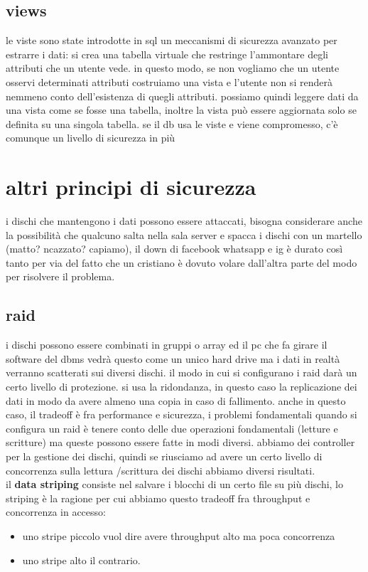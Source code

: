 \documentclass[12pt, oneside]{extbook} %
\begin{document}
\subsection{views}
le viste sono state introdotte in sql un meccanismi di sicurezza avanzato per estrarre i dati: si crea una tabella virtuale che restringe l'ammontare degli attributi che un utente vede. in questo modo, se non vogliamo che un utente osservi determinati attributi costruiamo una vista e l'utente non si renderà nemmeno conto dell'esistenza di quegli attributi. possiamo quindi leggere dati da una vista come se fosse una tabella, inoltre la vista può essere aggiornata solo se definita su una singola tabella. se il db usa le viste e viene compromesso, c'è comunque un livello di sicurezza in più

\section{altri principi di sicurezza}
i dischi che mantengono i dati possono essere attaccati, bisogna considerare anche la possibilità che qualcuno salta nella sala server e spacca i dischi con un martello (matto? ncazzato? capiamo), il down di facebook whatsapp e ig è durato così tanto per via del fatto che un cristiano è dovuto volare dall'altra parte del modo per risolvere il problema.
\subsection{raid}
i dischi possono essere combinati in gruppi o array ed il pc che fa girare il software del dbms vedrà questo come un unico hard drive ma i dati in realtà verranno scatterati sui diversi dischi. il modo in cui si configurano i raid darà un certo livello di protezione. si usa la ridondanza, in questo caso la replicazione dei dati in modo da avere almeno una copia in caso di fallimento. anche in questo caso, il tradeoff è fra performance e sicurezza, i problemi fondamentali quando si configura un raid è tenere conto delle due operazioni fondamentali (letture e scritture) ma queste possono essere fatte in modi diversi. abbiamo dei controller per la gestione dei dischi, quindi se riusciamo ad avere un certo livello di concorrenza sulla lettura /scrittura dei dischi abbiamo diversi risultati.\\il \textbf{data striping} consiste nel salvare i blocchi di un certo file su più dischi, lo striping è la ragione per cui abbiamo questo tradeoff fra throughput e concorrenza in accesso:
\begin{itemize}
	\item uno stripe piccolo vuol dire avere throughput alto ma poca concorrenza
	\item uno stripe alto il contrario.
\end{itemize}
\end{document}
